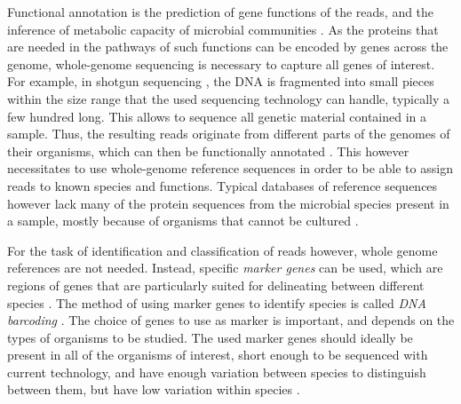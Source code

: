 Functional annotation \cite{Stein2001} is the prediction of gene functions of the reads,
and the inference of metabolic capacity of microbial communities \cite{Brown2017}.
As the proteins that are needed in the pathways of such functions can be encoded by genes across the genome,
whole-genome sequencing is necessary to capture all genes of interest.
For example, in shotgun sequencing \cite{Staden1979,Anderson1981},
the DNA is fragmented into small pieces within the size range that the used sequencing technology can handle,
typically a few hundred \si{\basepair} long.
This allows to sequence all genetic material contained in a sample.
Thus, the resulting reads originate from different parts of the genomes of their organisms,
which can then be functionally annotated \cite{Glass2010}.
This however necessitates to use whole-genome reference sequences
in order to be able to assign reads to known species and functions.
Typical databases of reference sequences however
lack many of the protein sequences from the microbial species present in a sample,
mostly because of organisms that cannot be cultured \cite{Brown2017}.

For the task of identification and classification of reads however, whole genome references are not needed.
Instead, specific \emph{marker genes} can be used,
which are regions of genes that are particularly suited for delineating between different species \cite{Ren2016}.
The method of using marker genes to identify species is called \emph{DNA barcoding} \cite{Hebert2003,Savolainen2005}.
The choice of genes to use as marker is important, and depends on the types of organisms to be studied.
The used marker genes should ideally be present in all of the organisms of interest,
short enough to be sequenced with current technology,
and have enough variation between species to distinguish between them,
but have low variation within species \cite{Kress2008}.

